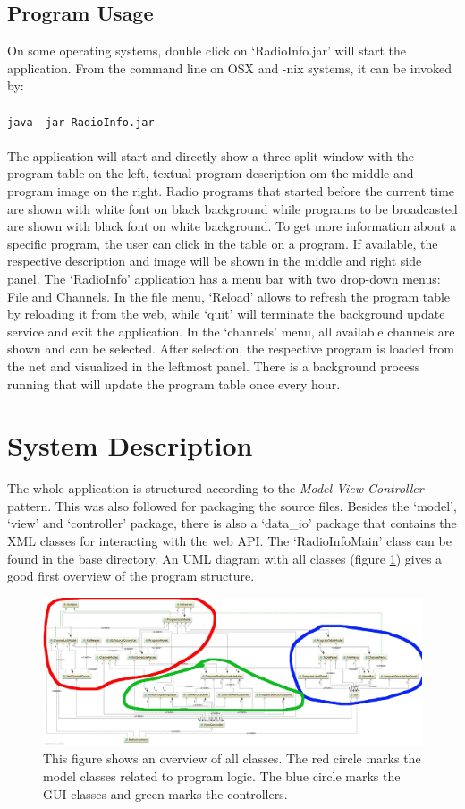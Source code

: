 \documentclass[a4paper,11pt,twoside]{article}
\begin{document}
\subsection{Program Usage}
On some operating systems, double click on `RadioInfo.jar' will start the application. From the command line on OSX and -nix systems, it can be invoked by: \\
\\
\verb+java -jar RadioInfo.jar+ \\
\\
The application will start and directly show a three split window with the program table on the left, textual program description om the middle and program image on the right.
Radio programs that started before the current time are shown with white font on black background while programs to be broadcasted are shown with black font on white background.
To get more information about a specific program, the user can click in the table on a program. If available, the respective description and image will be shown in the middle and right side panel.
The `RadioInfo' application has a menu bar with two drop-down menus: File and Channels. In the file menu, `Reload' allows to refresh the program table by reloading it from the web, while `quit' will terminate the background update service and exit the application. In the `channels' menu, all available channels are shown and can be selected. After selection, the respective program is loaded from the net and visualized in the leftmost panel.
There is a background process running that will update the program table once every hour. 


\section{System Description}
The whole application is structured according to the \textit{Model-View-Controller} pattern. This was also followed for packaging the source files. Besides the `model', `view' and `controller' package, there is also a `data\_io' package that contains the XML classes for interacting with the web API. The `RadioInfoMain' class can be found in the base directory.
An UML diagram with all classes (figure \ref{fig:overview}) gives a good first overview of the program structure.

\begin{figure}[p]
  \centering
  \includegraphics[width=1.5\textwidth, angle=90]{overview_color.png}
  \caption{This figure shows an overview of all classes. The red circle marks the model classes related to program logic. The blue circle marks the GUI classes and green marks the controllers.}
  \label{fig:overview}
\end{figure}
\end{document}

